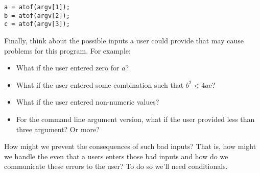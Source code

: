 \begin{verbatim}
a = atof(argv[1]);
b = atof(argv[2]);
c = atof(argv[3]);
\end{verbatim}

Finally, think about the possible inputs a user could provide that may cause problems
for this program.  For example:
\begin{itemize}
  \item What if the user entered zero for $a$?
  \item What if the user entered some combination such that $b^2 < 4ac$?
  \item What if the user entered non-numeric values?
  \item For the command line argument version, what if the user provided less than
  	three argument?  Or more?
\end{itemize}
How might we prevent the consequences of such bad inputs?  That is, 
how might we handle the even that a users enters those bad inputs and
how do we communicate these errors to the user?  To do so we'll need 
conditionals.




